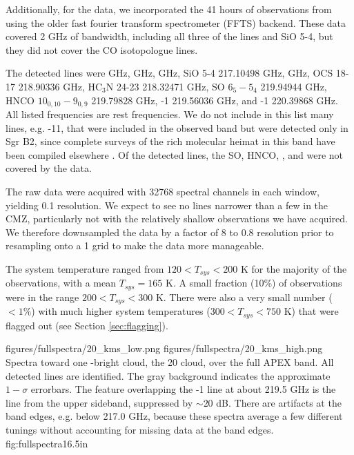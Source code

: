 Additionally, for the \para data, we incorporated the 41 hours of observations
from \citet{Ao2013a} using the older fast fourier transform spectrometer (FFTS)
backend.  These data covered 2 GHz of bandwidth, including all three of the
\para lines and SiO 5-4, but they did not cover the CO isotopologue lines.

The detected lines were \para {} GHz, \para {} GHz, \para {} GHz, SiO 5-4 217.10498 GHz,
\methanol {} GHz, OCS 18-17 218.90336 GHz, HC$_3$N 24-23
218.32471 GHz, SO $6_5-5_4$ 219.94944 GHz, HNCO $10_{0,10}-9_{0,9}$ 219.79828
GHz, -1 219.56036 GHz, and -1 220.39868 GHz.  All
listed frequencies are rest frequencies.  We do
not include in this list many lines, e.g. -11, that were
included in the observed band but were detected only in Sgr B2, since complete
surveys of the rich molecular heimat in this band have been compiled elsewhere
\citep{Nummelin1998a,Belloche2013a}.  Of the detected lines, the SO, HNCO,
\ceighteeno, and \thirteenco were not covered by the \citet{Ao2013a} data.  


The raw data were acquired with 32768 spectral channels in each window,
yielding 0.1 \kms resolution.  We expect to see no lines narrower than a few
\kms in the CMZ, particularly not with the relatively shallow observations we
have acquired.  We therefore downsampled the data by a factor of 8 to 0.8 \kms
resolution prior to resampling onto a 1 \kms grid to make the data more
manageable.  

The system temperature ranged from $120 < T_{sys} < 200$ K for the majority of
the observations, with a mean $T_{sys}=165$ K.  A small fraction (10\%) of
observations were in the range $200 < T_{sys} < 300$ K.  There were also a very
small number ($<1\%$) with much higher system temperatures ($300 < T_{sys} <
750$ K) that were flagged out (see Section \ref{sec:flagging}).

\FigureTwoAA
{figures/fullspectra/20_kms_low.png}
{figures/fullspectra/20_kms_high.png}
{Spectra toward one \formaldehyde-bright cloud, the 20 \kms cloud, over the full
APEX band.  All detected lines are identified.  The gray background indicates
the approximate $1-\sigma$ errorbars. The feature overlapping the -1
line at about 219.5 GHz is the \twelveco line from the upper sideband,
suppressed by $\sim20$ dB.
There are artifacts at the band edges, e.g. below 217.0 GHz, because these
spectra average a few different tunings without accounting for missing data at
the band edges.}
{fig:fullspectra}{1}{6.5in}

